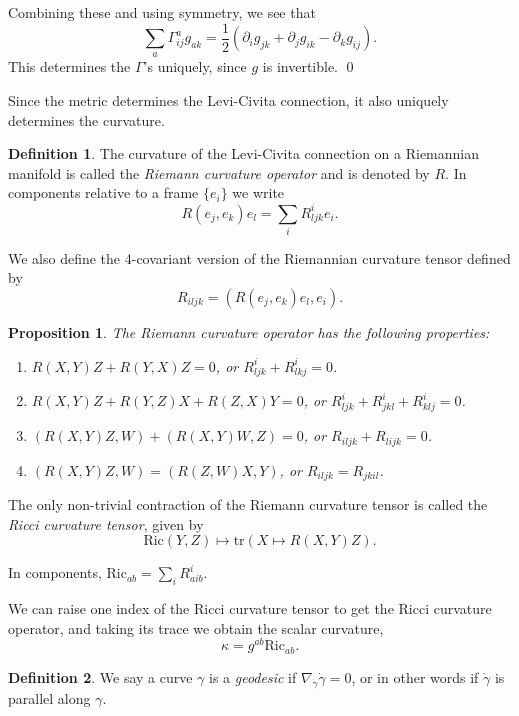 \documentclass[12pt, reqno]{extarticle}
\theoremstyle{plain}
\newtheorem{proposition}{Proposition}[section]
\theoremstyle{definition}
\newtheorem{definition}{Definition}[section]
\theoremstyle{remark}
\begin{document}
Combining these and using symmetry, we see that 
\[
    \sum_a \Gamma_{ij}^a g_{ak} = \frac{1}{2}\left(\partial_i g_{jk} + \partial_j g_{ik}
    - \partial_k g_{ij}\right).
\]
This determines the $\Gamma$'s uniquely, since $g$ is invertible. \qed 

Since the metric determines the Levi-Civita connection, it also uniquely determines the 
curvature. 

\begin{definition}
    The curvature of the Levi-Civita connection on a Riemannian manifold 
    is called the \textit{Riemann curvature operator} and is denoted by $R$. In components
    relative to a frame $\{e_i\}$ we write 
    \[
        R(e_j, e_k)e_l = \sum_i R_{ljk}^i e_i.
    \]
\end{definition}

We also define the 4-covariant version of the Riemannian curvature tensor defined by 
\[
    R_{iljk} = (R(e_j,e_k)e_l, e_i).
\]

\begin{proposition}
    The Riemann curvature operator has the following properties:
    \begin{enumerate}
        \item[(i)] $R(X,Y)Z + R(Y,X)Z = 0$, or $R_{ljk}^i + R_{lkj}^i = 0$.
        \item[(ii)] $R(X,Y)Z + R(Y,Z)X + R(Z,X)Y = 0$, 
        or $R_{ljk}^i + R_{jkl}^i + R_{klj}^i = 0$.
        \item[(iii)] $(R(X,Y)Z, W) + (R(X,Y)W, Z) = 0$, or $R_{iljk} + R_{lijk} = 0$. 
        \item[(iv)] $(R(X,Y)Z, W) = (R(Z,W)X,Y)$, or $R_{iljk} = R_{jkil}$.
    \end{enumerate}
\end{proposition}

The only non-trivial contraction of the Riemann curvature tensor is called 
the \textit{Ricci curvature tensor}, given by 
\[
    \text{Ric}(Y,Z) \mapsto \text{tr}\left(X \mapsto R(X,Y)Z\right).
\]

In components, $\text{Ric}_{ab} = \sum_i R^i_{aib}$.

We can raise one index of the Ricci curvature tensor to get the Ricci curvature
operator, and taking its trace we obtain the scalar curvature,
\[
    \kappa = g^{ab}\text{Ric}_{ab}.
\]

\begin{definition}
    We say a curve $\gamma$ is a \textit{geodesic} if $\nabla_{\dot{\gamma}}\dot{\gamma} = 0$,
    or in other words if $\dot{\gamma}$ is parallel along $\gamma$. 
\end{definition}
\end{document}
